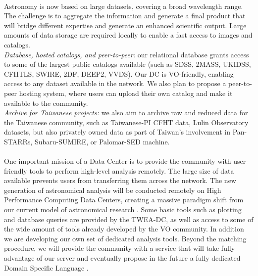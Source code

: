 \\
Astronomy is now based on large datasets, covering a broad wavelength range. The challenge is to aggregate the information and generate a final product that will bridge different expertise and generate an enhanced scientific output. Large amounts of data storage are required locally to enable a fast access to images and catalogs.  \\ 
{\it Database, hosted catalogs, and peer-to-peer:} our relational database grants access to some of the largest public catalogs available (such as SDSS, 2MASS, UKIDSS, CFHTLS, SWIRE, 2DF, DEEP2, VVDS). Our DC is VO-friendly, enabling access to any dataset available in the network. We also plan to propose a peer-to-peer hosting system, where users can upload their own catalog and make it available to the community.\\
{\it Archive for Taiwanese projects:} we also aim to archive raw and reduced data for the Taiwanese community, such as Taiwanese-PI CFHT data, Lulin Observatory datasets, but also privately owned data as part of Taiwan's involvement in Pan-STARRs, Subaru-SUMIRE, or Palomar-SED machine.\\

\\
One important mission of a Data Center is to provide the community with user-friendly tools to perform high-level analysis remotely. The large size of data available prevents users from transferring them across the network. The new generation of astronomical analysis will be conducted remotely on High Performance Computing Data Centers, creating a massive paradigm shift from our current model of astronomical research \citep[the {\it Fourth Paradigm} -][]{fourthpar}. Some basic tools such as plotting and database queries are provided by the TWEA-DC, as well as access to some of the wide amount of tools already developed by the VO community. In addition we are developing our own set of dedicated analysis tools. Beyond the matching procedure, we will provide the community with a service that will take fully advantage of our server and eventually propose in the future a fully dedicated Domain Specific Language \citep{O18_adassxxii}.

